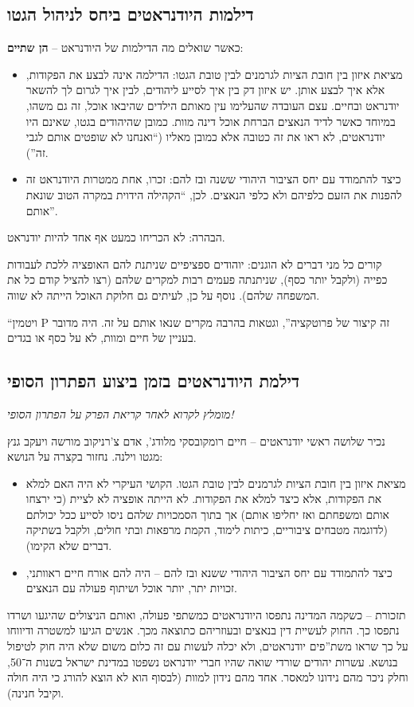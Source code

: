 \documentclass[a4paper]{book}
\begin{document}
	\subsection{דילמות היודנראטים ביחס לניהול הגטו}
	
	כאשר שואלים מה הדילמות של היודנראט – \textbf{הן שתיים}: 
	\begin{itemize}
		\item מציאת איזון בין חובת הציות לגרמנים לבין טובת הגטו: הדילמה אינה לבצע את הפקודות, אלא איך לבצע אותן. יש איזון דק בין איך לסייע ליהודים, לבין איך לגרום לך להשאר יודנראט ובחיים. עצם העובדה שהעלימו עין מאותם הילדים שהיבאו אוכל, זה גם משהו, במיוחד כאשר לדיד הנאצים הברחת אוכל דינה מוות. כמובן שהיהודים בגטו, שאינם היו יודנראטים, לא ראו את זה כטובה אלא כמובן מאליו (``ואנחנו לא שופטים אותם לגבי זה''). 
		\item כיצד להתמודד עם יחס הציבור היהודי ששנה ובז להם: זכרו, אחת ממטרות היודנראט זה להפנות את הזעם כלפיהם ולא כלפי הנאצים. לכן, ``הקהילה הידוית במקרה הטוב שונאת אותם''. 
	\end{itemize}
	הבהרה: לא הכריחו כמעט אף אחד להיות יודנראט. 
	
	קורים כל מני דברים לא הוגנים: יוהודים ספציפיים שניתנת להם האופציה ללכת לעבודות כפייה (ולקבל יותר כסף), שניתנתה פעמים רבות למקרים שלהם (רצו להציל קודם כל את המשפחה שלהם). נוסף על כן, לעיתים גם חלוקת האוכל הייתה לא שווה. 
	
	``ויטמין P זה קיצור של פרוטקציה'', וגטאות בהרבה מקרים שנאו אותם על זה. היה מדובר בעניין של חיים ומוות, לא על כסף או בגדים. 
	
	
	\subsection{דילמת היודנראטים בזמן ביצוע הפתרון הסופי}
	\textit{מומלץ לקרוא לאחר קריאת הפרק על הפתרון הסופי!}
	
	נכיר שלושה ראשי יודנראטים – חיים רומקובסקי מלודג', אדם צ'רניקוב מורשה ויעקב גנץ מגטו וילנה. נחזור בקצרה על הנושא: 
	\begin{itemize}
		\item מציאת איזון בין חובת הציות לגרמנים לבין טובת הגטו. הקושי העיקרי לא היה האם למלא את הפקודות, אלא כיצד למלא את הפקודות. לא הייתה אופציה לא לציית (כי ירצחו אותם ומשפחתם ואז יחליפו אותם) אך בתוך הסמכויות שלהם ניסו לסייע ככל יכולתם (לדוגמה מטבחים ציבוריים, כיתות לימוד, הקמת מרפאות ובתי חולים, ולקבל בשתיקה דברים שלא הקימו). 
		\item כיצד להתמודד עם יחס הציבור היהודי ששנא ובז להם – היה להם אורח חיים ראוותני, זכויות יתר, יותר אוכל ושיתוף פעולה עם הנאצים. 
	\end{itemize}
	תזכורת – כשקמה המדינה נתפסו היודנראטים כמשתפי פעולה, ואותם הניצולים שהיגעו ושרדו נתפסו כך. החוק לעשיית דין בנאצים ובעוזריהם כתוצאה מכך. אנשים הגיעו למשטרה ודיווחו על כך שראו משת''פים יודנראטים, ולא יכלה לעשות עם זה כלום משום שלא היה חוק לטיפול בנושא. עשרות יהודים שורדי שואה שהיו חברי יודנראט נשפטו במדינת ישראל בשנות ה־50, וחלק ניכר מהם נידונו למאסר. אחד מהם נידון למוות (לבסוף הוא לא הוצא להורג כי היה חולה וקיבל חנינה). 
	
\end{document}
